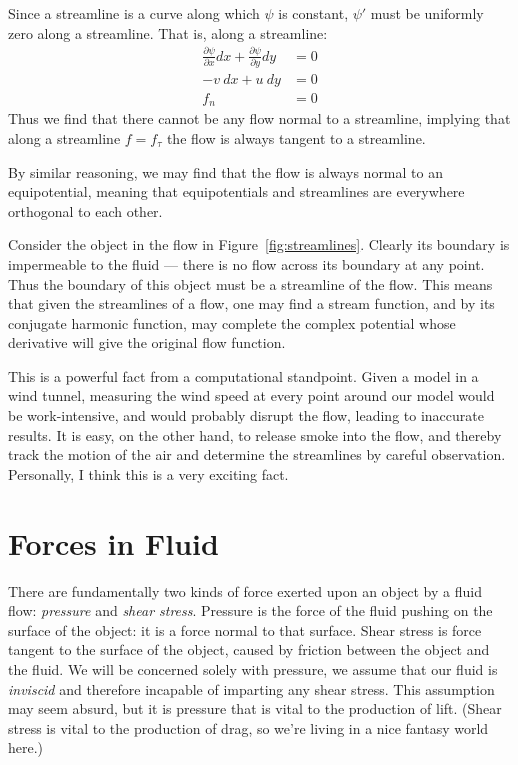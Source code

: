 \documentclass[letterpaper, twoside, 12 pt]{article}
\begin{document}
	Since a streamline is a curve along which $\psi$ is constant, $\psi'$ must be uniformly zero along a streamline.
	That is, along a streamline:
	\begin{align*}
		\frac{\partial \psi}{\partial x}dx + \frac{\partial \psi}{\partial y}dy &= 0 \\
		-v\> dx  + u\> dy &= 0 \\
		f_n &= 0
	\end{align*}
	Thus we find that there cannot be any flow normal to a streamline, implying that along a streamline $f = f_\tau$ the flow is always tangent to a streamline.

	By similar reasoning, we may find that the flow is always normal to an equipotential, meaning that equipotentials and streamlines are everywhere orthogonal to each other.

	Consider the object in the flow in Figure~\ref{fig:streamlines}.
	Clearly its boundary is impermeable to the fluid --- there is no flow across its boundary at any point.
	Thus the boundary of this object must be a streamline of the flow.
	This means that given the streamlines of a flow, one may find a stream function, and by its conjugate harmonic function, may complete the complex potential whose derivative will give the original flow function.

	This is a powerful fact from a computational standpoint.
	Given a model in a wind tunnel, measuring the wind speed at every point around our model would be work-intensive, and would probably disrupt the flow, leading to inaccurate results.
	It is easy, on the other hand, to release smoke into the flow, and thereby track the motion of the air and determine the streamlines by careful observation.
	Personally, I think this is a very exciting fact.

\section{Forces in Fluid} %
\label{sec:forces_in_fluid}

	There are fundamentally two kinds of force exerted upon an object by a fluid flow: \textit{pressure} and \textit{shear stress}.
	Pressure is the force of the fluid pushing on the surface of the object: it is a force normal to that surface.
	Shear stress is force tangent to the surface of the object, caused by friction between the object and the fluid.
	We will be concerned solely with pressure, we assume that our fluid is \textit{inviscid} and therefore incapable of imparting any shear stress.
	This assumption may seem absurd, but it is pressure that is vital to the production of lift.
	(Shear stress is vital to the production of drag, so we're living in a nice fantasy world here.)
\end{document}
